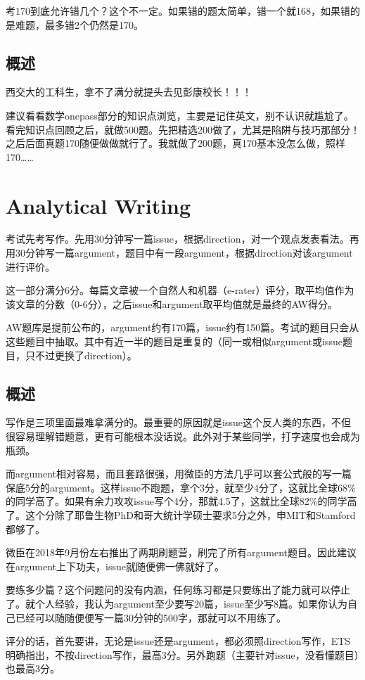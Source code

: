 \documentclass[cn,plain]{./src/qyxfbook}
\begin{document}
考170到底允许错几个？这个不一定。如果错的题太简单，错一个就168，如果错的是难题，最多错2个仍然是170。

\section{概述}
西交大的工科生，拿不了满分就提头去见彭康校长！！！

建议看看数学onepass部分的知识点浏览，主要是记住英文，别不认识就尴尬了。看完知识点回顾之后，就做500题。先把精选200做了，尤其是陷阱与技巧那部分！之后后面真题170随便做做就行了。我就做了200题，真170基本没怎么做，照样170……

\chapter{Analytical Writing}
考试先考写作。先用30分钟写一篇issue，根据direction，对一个观点发表看法。再用30分钟写一篇argument，题目中有一段argument，根据direction对该argument进行评价。

这一部分满分6分。每篇文章被一个自然人和机器（e-rater）评分，取平均值作为该文章的分数（0-6分），之后issue和argument取平均值就是最终的AW得分。

AW题库是提前公布的，argument约有170篇，issue约有150篇。考试的题目只会从这些题目中抽取。其中有近一半的题目是重复的（同一或相似argument或issue题目，只不过更换了direction）。

\section{概述}
写作是三项里面最难拿满分的。最重要的原因就是issue这个反人类的东西，不但很容易理解错题意，更有可能根本没话说。此外对于某些同学，打字速度也会成为瓶颈。

而argument相对容易，而且套路很强，用微臣的方法几乎可以套公式般的写一篇保底5分的argument。这样issue不跑题，拿个3分，就至少4分了，这就比全球68\%的同学高了。如果有余力攻攻issue写个4分，那就4.5了，这就比全球82\%的同学高了。这个分除了耶鲁生物PhD和哥大统计学硕士要求5分之外，申MIT和Stamford都够了。

微臣在2018年9月份左右推出了两期刷题营，刷完了所有argument题目。因此建议在argument上下功夫，issue就随便佛一佛就好了。

要练多少篇？这个问题问的没有内涵，任何练习都是只要练出了能力就可以停止了。就个人经验，我认为argument至少要写20篇，issue至少写8篇。如果你认为自己已经可以随随便便写一篇30分钟的500字，那就可以不用练了。

评分的话，首先要讲，无论是issue还是argument，都必须照direction写作，ETS明确指出，不按direction写作，最高3分。另外跑题（主要针对issue，没看懂题目）也最高3分。
\end{document}
